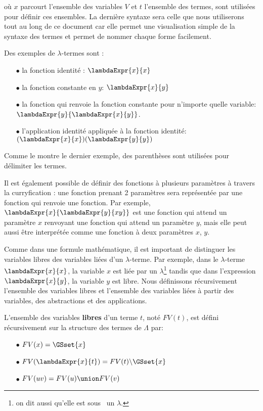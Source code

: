 où $x$ parcourt l'ensemble des variables $V$ et $t$ l'ensemble des termes, sont
utilisées pour définir ces ensembles. La dernière syntaxe sera celle que nous
utiliserons tout au long de ce document car elle permet une visualisation simple
de la syntaxe des termes et permet de nommer chaque forme facilement.

Des exemples de $\lambda$-termes sont :
\begin{itemize}
  \item[$\bullet$] la fonction identité : $\lambdaExpr{x}{x}$
  \item[$\bullet$] la fonction constante en $y$: $\lambdaExpr{x}{y}$
  \item[$\bullet$] la fonction qui renvoie la fonction constante pour n'importe quelle
    variable: $\lambdaExpr{y}{\lambdaExpr{x}{y}}$.
  \item[$\bullet$] l'application identité appliquée à la fonction identité:
    $(\lambdaExpr{x}{x}) (\lambdaExpr{y}{y})$
\end{itemize}

Comme le montre le dernier exemple, des parenthèses sont utilisées pour
délimiter les termes.

Il est également possible de définir des fonctions à plusieurs paramètres à
travers la curryfication : une fonction prenant 2 paramètres sera représentée
par une fonction qui renvoie une fonction. Par exemple,
$\lambdaExpr{x}{\lambdaExpr{y}{x y}}$ est une fonction qui attend un paramètre
$x$ renvoyant une fonction qui attend un paramètre $y$,
mais elle peut aussi être interprétée comme une fonction à deux paramètres $x$, $y$.

Comme dans une formule mathématique, il est important de distinguer les
variables libres des variables liées d'un $\lambda$-terme. Par exemple, dans
le $\lambda$-terme $\lambdaExpr{x}{x}$, la variable $x$ est liée par un
$\lambda$\footnote{on dit aussi qu'elle est \og sous \fg \, un $\lambda$.}
tandis que dans l'expression $\lambdaExpr{x}{y}$, la variable $y$ est libre.
Nous définissons récursivement l'ensemble des variables libres et l'ensemble des
variables liées à partir des variables, des abstractions et des applications.

\begin{definition} 
  L'ensemble des variables \textbf{libres} d'un terme $t$, noté $FV(t)$, est défini
  récursivement sur la structure des termes de $\Lambda$ par:
  \begin{itemize}
  \item[$\bullet$] $FV(x) = \GSset{x}$
  \item[$\bullet$] $FV(\lambdaExpr{x}{t}) = FV(t) \backslash \GSset{x}$
  \item[$\bullet$] $FV(u v) = FV(u) \union FV(v)$
  \end{itemize}
\end{definition}

